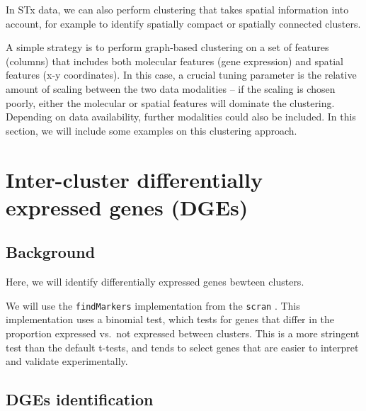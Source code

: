 \documentclass[
]{book}
\newenvironment{Shaded}{\begin{snugshade}}{\end{snugshade}}
\newcommand{\AttributeTok}[1]{\textcolor[rgb]{0.13,0.29,0.53}{#1}}
\newcommand{\DocumentationTok}[1]{\textcolor[rgb]{0.56,0.35,0.01}{\textbf{\textit{#1}}}}
\newcommand{\FunctionTok}[1]{\textcolor[rgb]{0.13,0.29,0.53}{\textbf{#1}}}
\newcommand{\NormalTok}[1]{#1}
\newcommand{\OtherTok}[1]{\textcolor[rgb]{0.56,0.35,0.01}{#1}}
\newcommand{\SpecialCharTok}[1]{\textcolor[rgb]{0.81,0.36,0.00}{\textbf{#1}}}
\newcommand{\StringTok}[1]{\textcolor[rgb]{0.31,0.60,0.02}{#1}}
\begin{document}
In STx data, we can also perform clustering that takes spatial information into account, for example to identify spatially compact or spatially connected clusters.

A simple strategy is to perform graph-based clustering on a set of features (columns) that includes both molecular features (gene expression) and spatial features (x-y coordinates). In this case, a crucial tuning parameter is the relative amount of scaling between the two data modalities -- if the scaling is chosen poorly, either the molecular or spatial features will dominate the clustering. Depending on data availability, further modalities could also be included. In this section, we will include some examples on this clustering approach.

\hypertarget{inter-cluster-differentially-expressed-genes-dges}{%
\section{Inter-cluster differentially expressed genes (DGEs)}\label{inter-cluster-differentially-expressed-genes-dges}}

\hypertarget{background-4}{%
\subsection{Background}\label{background-4}}

Here, we will identify differentially expressed genes bewteen clusters.

We will use the \texttt{findMarkers} implementation from the \texttt{scran} \citep{Lun2016Oct}. This implementation uses a binomial test, which tests for genes that differ in the proportion expressed vs.~not expressed between clusters. This is a more stringent test than the default t-tests, and tends to select genes that are easier to interpret and validate experimentally.

\hypertarget{dges-identification}{%
\subsection{DGEs identification}\label{dges-identification}}

\begin{Shaded}
\end{Shaded}
\end{document}
